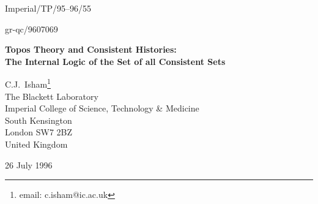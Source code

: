 \begin{titlepage}

\hspace{8truecm}Imperial/TP/95--96/55

\hspace{8truecm}gr-qc/9607069

\begin{center}
        {\large\bf Topos Theory and Consistent Histories:\\[7pt]
			The Internal Logic of the Set of all Consistent Sets}
\end{center}
\vspace{0.8 truecm}
\begin{center}
        C.J.~Isham\footnote{email: c.isham@ic.ac.uk}\\[15pt]
        The Blackett Laboratory\\
        Imperial College of Science, Technology \& Medicine\\
        South Kensington\\
        London SW7 2BZ\\
        United Kingdom\\
\end{center}

\begin{center} 26 July 1996 \end{center}

\begin{abstract} 
A major problem in the consistent-histories approach to quantum
theory is contending with the potentially large number of consistent
sets of history propositions. One possibility is to find a scheme in
which a unique set is selected in some way. However, in this paper
we consider the alternative approach in which all consistent sets
are kept, leading to a type of `many world-views' picture of the
quantum theory.  It is shown that a natural way of handling this
situation is to employ the theory of varying sets (presheafs) on the
space $\B$ of all Boolean subalgebras of the orthoalgebra $\UP$ of
history propositions. This approach automatically includes the
feature whereby probabilistic predictions are meaningful only in the
context of a consistent set of history propositions.  More
strikingly, it leads to a picture in which the `truth values', or
`semantic values' of such contextual predictions are not just
two-valued (\ie true and false) but instead lie in a larger logical
algebra---a Heyting algebra---whose structure is determined by the
space $\B$ of Boolean subalgebras of $\UP$.

	This topos-theoretic structure thereby gives a coherent
mathematical framework in which to understand the internal logic of
the many world-views picture that arises naturally in the approach
to quantum theory based on the ideas of consistent histories.
\end{abstract}
 
\end{titlepage}



